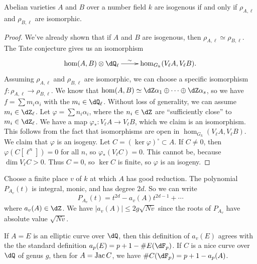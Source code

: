\begin{theorem}
Abelian varieties $A$ and $B$ over a number field $k$ are isogenous if and only 
if $\rho_{A,\ell}$ and $\rho_{B,\ell}$ are isomorphic. 
\end{theorem}
\begin{proof}
We've already shown that if $A$ and $B$ are isogenous, then 
$\rho_{A,\ell}\simeq \rho_{B,\ell}$. The Tate conjecture gives us an 
isomorphism 
\[\xymatrix{
  \hom(A,B)\otimes\dQ_\ell \ar[r]^-\sim 
    & \hom_{G_k}(V_\ell A,V_\ell B) \text{.}
}\]
Assuming $\rho_{A,\ell}$ and $\rho_{B,\ell}$ are isomorphic, we can choose 
a specific isomorphism $f:\rho_{A,\ell}\to \rho_{B,\ell}$. We know that 
$\hom(A,B)\simeq \dZ \alpha_1\oplus \cdots \oplus \dZ \alpha_s$, so we have 
$f=\sum m_i \alpha_i$ with the $m_i\in \dQ_\ell$. Without loss of generality, 
we can assume $m_i\in \dZ_\ell$. Let $\varphi=\sum n_i \alpha_i$, where the 
$n_i\in \dZ$ are ``sufficiently close'' to $m_i\in \dZ_\ell$. We have a map 
$\varphi_\ast:V_\ell A \to V_\ell B$, which we claim is an isomorphism. 
This follows from the fact that isomorphisms are open in 
$\hom_{G_k}(V_\ell A,V_\ell B)$. We claim that $\varphi$ is an isogeny. 
Let $C=(\ker\varphi)^\circ\subset A$. If $C\ne 0$, then $\varphi(C[\ell^n])=0$ 
for all $n$, so $\varphi_\ast(V_\ell C)=0$. This cannot be, because 
$\dim V_\ell C>0$. Thus $C=0$, so $\ker C$ is finite, so $\varphi$ is an 
isogeny. 
\end{proof}

Choose a finite place $v$ of $k$ at which $A$ has good reduction. The 
polynomial $P_{A_v}(t)$ is integral, monic, and has degree $2 d$. So we can 
write 
\[
  P_{A_v}(t) = t^{2 d} - a_v(A) t^{2 d-1} + \cdots 
\]
where $a_v(A)\in \dZ$. We have $|a_v(A)|\leqslant 2 g \sqrt{N v}$ since the 
roots of $P_{A_v}$ have absolute value $\sqrt{N v}$. 

If $A=E$ is an elliptic curve over $\dQ$, then this definition of $a_v(E)$ 
agrees with the the standard definition $a_p(E)=p+1-\# E(\dF_p)$. If 
$C$ is a nice curve over $\dQ$ of genus $g$, then for 
$A=\operatorname{Jac} C$, we have $\# C(\dF_p) = p+1-a_p(A)$. 

